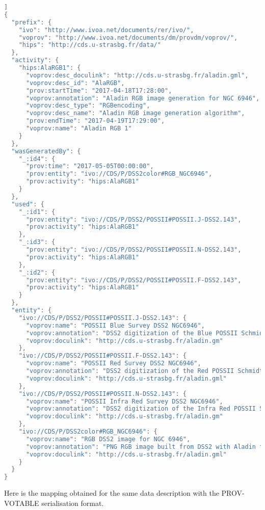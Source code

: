 \begin{lstlisting}[language=C, caption= JSON serialisation example for a Color composition Activity]]
{
  "prefix": {
    "ivo": "http://www.ivoa.net/documents/rer/ivo/",
    "voprov": "http://www.ivoa.net/documents/dm/provdm/voprov/",
    "hips": "http://cds.u-strasbg.fr/data/"
  },
  "activity": {
    "hips:AlaRGB1": {
      "voprov:desc_doculink": "http://cds.u-strasbg.fr/aladin.gml",
      "voprov:desc_id": "AlaRGB",
      "prov:startTime": "2017-04-18T17:28:00",
      "voprov:annotation": "Aladin RGB image generation for NGC 6946",
      "voprov:desc_type": "RGBencoding",
      "voprov:desc_name": "Aladin RGB image generation algorithm",
      "prov:endTime": "2017-04-19T17:29:00",
      "voprov:name": "Aladin RGB 1"
    }
  },
  "wasGeneratedBy": {
    "_:id4": {
      "prov:time": "2017-05-05T00:00:00",
      "prov:entity": "ivo://CDS/P/DSS2color#RGB_NGC6946",
      "prov:activity": "hips:AlaRGB1"
    }
  },
  "used": {
    "_:id1": {
      "prov:entity": "ivo://CDS/P/DSS2/POSSII#POSSII.J-DSS2.143",
      "prov:activity": "hips:AlaRGB1"
    },
    "_:id3": {
      "prov:entity": "ivo://CDS/P/DSS2/POSSII#POSSII.N-DSS2.143",
      "prov:activity": "hips:AlaRGB1"
    },
    "_:id2": {
      "prov:entity": "ivo://CDS/P/DSS2/POSSII#POSSII.F-DSS2.143",
      "prov:activity": "hips:AlaRGB1"
    }
  },
  "entity": {
    "ivo://CDS/P/DSS2/POSSII#POSSII.J-DSS2.143": {
      "voprov:name": "POSSII Blue Survey DSS2 NGC6946",
      "voprov:annotation": "DSS2 digitization of the Blue POSSII Schmidt survey around  NGC 6946",
      "voprov:doculink": "http://cds.u-strasbg.fr/aladin.gm"
    },
    "ivo://CDS/P/DSS2/POSSII#POSSII.F-DSS2.143": {
      "voprov:name": "POSSII Red Survey DSS2 NGC6946",
      "voprov:annotation": "DSS2 digitization of the Red POSSII Schmidt survey around NGC 6946",
      "voprov:doculink": "http://cds.u-strasbg.fr/aladin.gml"
    },
    "ivo://CDS/P/DSS2/POSSII#POSSII.N-DSS2.143": {
      "voprov:name": "POSSII Infra Red Survey DSS2 NGC6946",
      "voprov:annotation": "DSS2 digitization of the Infra Red POSSII Schmidt survey around NGC 6946",
      "voprov:doculink": "http://cds.u-strasbg.fr/aladin.gm"
    },
    "ivo://CDS/P/DSS2color#RGB_NGC6946": {
      "voprov:name": "RGB DSS2 image for NGC 6946",
      "voprov:annotation": "PNG RGB image built from DSS2 with Aladin for galaxy NGC 6946",
      "voprov:doculink": "http://cds.u-strasbg.fr/aladin.gml"
    }
  }
}
\end{lstlisting}

Here is the mapping obtained for the same data description with the PROV-VOTABLE serialisation format.

